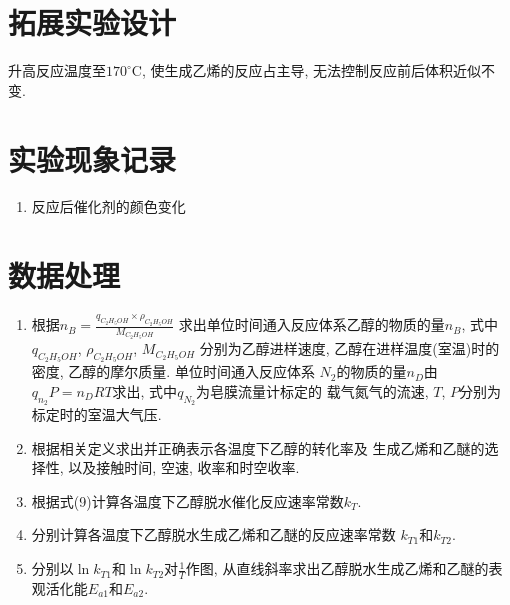 \documentclass[a4paper]{article}
\begin{document}

\section{拓展实验设计}
升高反应温度至$170^\circ$C, 使生成乙烯的反应占主导, 无法控制反应前后体积近似不变.
\section{实验现象记录}
\begin{enumerate}
	\item 反应后催化剂的颜色变化
\end{enumerate}

\newpage
\section{数据处理}
\begin{enumerate}
\item 根据$n_{B} = \frac{q_{C_{2}H_{5}OH}\times \rho_{C_{2}H_{5}OH}}{M_{C_{2}H_{5}OH}}$
求出单位时间通入反应体系乙醇的物质的量$n_{B}$, 式中$q_{C_{2}H_{5}OH}$, $\rho_{C_{2}H_{5}OH}$, $M_{C_{2}H_{5}OH}$
分别为乙醇进样速度, 乙醇在进样温度(室温)时的密度, 乙醇的摩尔质量. 单位时间通入反应体系
$N_{2}$的物质的量$n_{D}$由$q_{n_{2}}P = n_{D}RT$求出, 式中$q_{N_{2}}$为皂膜流量计标定的
载气氮气的流速, $T$, $P$分别为标定时的室温大气压.
\item 根据相关定义求出并正确表示各温度下乙醇的转化率及
生成乙烯和乙醚的选择性, 以及接触时间, 空速, 收率和时空收率.
\item 根据式(9)计算各温度下乙醇脱水催化反应速率常数$k_{T}$.
\item 分别计算各温度下乙醇脱水生成乙烯和乙醚的反应速率常数
$k_{T1}$和$k_{T2}$.
\item 分别以$\ln k_{T1}$和$\ln k_{T2}$对$\frac{1}{T}$作图, 
从直线斜率求出乙醇脱水生成乙烯和乙醚的表观活化能$E_{a1}$和$E_{a2}$.

\end{enumerate}
\newpage
\end{document}
